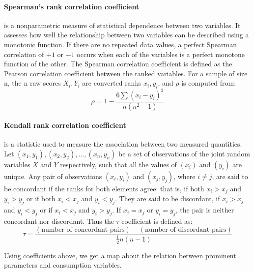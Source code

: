     \paragraph{Spearman's rank correlation coefficient} is a nonparametric measure of statistical dependence between two variables. It assesses how well the relationship between two variables can be described using a monotonic function. If there are no repeated data values, a perfect Spearman correlation of $+1$ or $-1$ occurs when each of the variables is a perfect monotone function of the other\cite{Spearman}\cite{spearmanr}. The Spearman correlation coefficient is defined as the Pearson correlation coefficient between the ranked variables\cite{rankedvariable}. For a sample of size n, the n raw scores $X_i,Y_i$ are converted ranks $x_i, y_i$, and $\rho$ is computed from:
    $$
    \rho = 1 - \frac{6\sum{(x_i-y_i)^2}}{n(n^2-1)}
    $$

    \paragraph{Kendall rank correlation coefficient} is a statistic used to measure the association between two measured quantities. Let $(x_1, y_1),(x_2, y_2),\dots,(x_n, y_n)$ be a set of observations of the joint random variables $X$ and $Y$ respectively, such that all the values of $(x_i)$ and $(y_i)$ are unique. Any pair of observations $(x_i,y_i)$ and $(x_j, y_j)$, where $i\neq j$, are said to be concordant if the ranks for both elements agree: that is, if both $x_i > x_j$ and $y_i > y_j$ or if both $x_i < x_j$ and $y_i < y_j$. They are said to be discordant, if $x_i > x_j$ and $y_i < y_j$ or if $x_i < x_j$ and $y_i > y_j$. If $x_i = x_j$ or $y_i = y_j$, the pair is neither concordant nor discordant. Thus the $\tau$ coefficient is defined as\cite{Kendall}\cite{kendalltau}:
    $$
    \tau = \frac{(\text{number of concordant pairs}) - (\text{number of discordant pairs})}{\frac{1}{2} n (n-1)}
    $$

    Using coefficients above, we get a map about the relation between prominent parameters and consumption variables.

